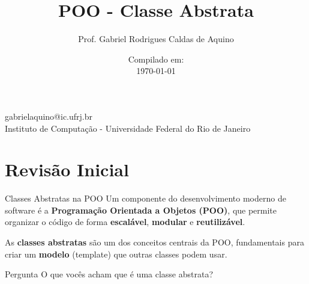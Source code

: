 \title{POO - Classe Abstrata}

\author{Prof. Gabriel Rodrigues Caldas de Aquino}

\institute
{
    gabrielaquino@ic.ufrj.br\\
    
    Instituto de Computação -
    Universidade Federal do Rio de Janeiro %
}
\date{Compilado em: \\ \today} %


\section{Revisão Inicial}

\begin{frame}
    \titlepage
\end{frame}




\begin{frame}{Classes Abstratas na POO}
    Um componente do desenvolvimento moderno de software é a 
    \textbf{Programação Orientada a Objetos (POO)}, 
    que permite organizar o código de forma 
    \textbf{escalável}, \textbf{modular} e \textbf{reutilizável}. 
    
    \vspace{0.3cm}
    As \textbf{classes abstratas} são um dos conceitos centrais da POO, 
    fundamentais para criar um \textbf{modelo} (template) que outras classes podem usar.

\begin{block}{Pergunta}
    O que vocês acham que é uma classe abstrata?
\end{block}
\end{frame}


